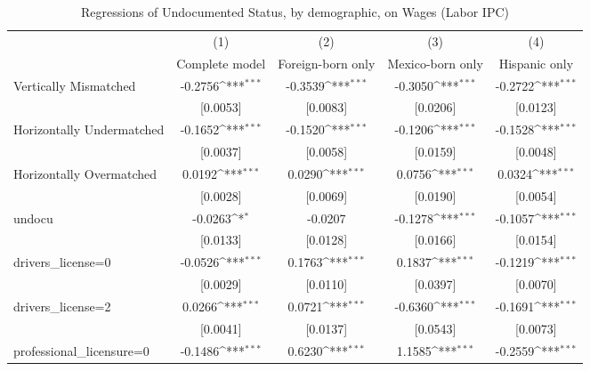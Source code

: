 \begin{table}[htbp]\centering
\def\sym#1{\ifmmode^{#1}\else\(^{#1}\)\fi}
\caption{Regressions of Undocumented Status, by demographic, on Wages (Labor IPC)}
\begin{tabular}{l*{4}{c}}
\toprule
                    &\multicolumn{1}{c}{(1)}         &\multicolumn{1}{c}{(2)}         &\multicolumn{1}{c}{(3)}         &\multicolumn{1}{c}{(4)}         \\
                    &Complete model         &Foreign-born only         &Mexico-born only         &Hispanic only         \\
\midrule
Vertically Mismatched&     -0.2756\sym{***}&     -0.3539\sym{***}&     -0.3050\sym{***}&     -0.2722\sym{***}\\
                    &    [0.0053]         &    [0.0083]         &    [0.0206]         &    [0.0123]         \\
\addlinespace
Horizontally Undermatched&     -0.1652\sym{***}&     -0.1520\sym{***}&     -0.1206\sym{***}&     -0.1528\sym{***}\\
                    &    [0.0037]         &    [0.0058]         &    [0.0159]         &    [0.0048]         \\
\addlinespace
Horizontally Overmatched&      0.0192\sym{***}&      0.0290\sym{***}&      0.0756\sym{***}&      0.0324\sym{***}\\
                    &    [0.0028]         &    [0.0069]         &    [0.0190]         &    [0.0054]         \\
\addlinespace
undocu              &     -0.0263\sym{*}  &     -0.0207         &     -0.1278\sym{***}&     -0.1057\sym{***}\\
                    &    [0.0133]         &    [0.0128]         &    [0.0166]         &    [0.0154]         \\
\addlinespace
drivers\_license=0   &     -0.0526\sym{***}&      0.1763\sym{***}&      0.1837\sym{***}&     -0.1219\sym{***}\\
                    &    [0.0029]         &    [0.0110]         &    [0.0397]         &    [0.0070]         \\
\addlinespace
drivers\_license=2   &      0.0266\sym{***}&      0.0721\sym{***}&     -0.6360\sym{***}&     -0.1691\sym{***}\\
                    &    [0.0041]         &    [0.0137]         &    [0.0543]         &    [0.0073]         \\
\addlinespace
professional\_licensure=0&     -0.1486\sym{***}&      0.6230\sym{***}&      1.1585\sym{***}&     -0.2559\sym{***}\\

\end{tabular}
\end{table}
